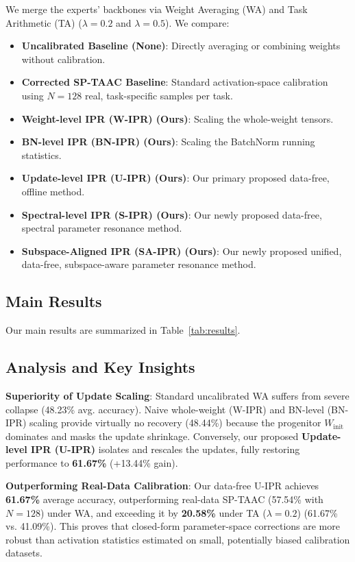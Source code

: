 \documentclass{article}
\begin{document}
We merge the experts' backbones via Weight Averaging (WA) and Task Arithmetic (TA) ($\lambda = 0.2$ and $\lambda = 0.5$). We compare:
\begin{itemize}
    \setlength{\itemsep}{1pt}
    \setlength{\parskip}{0pt}
    \setlength{\parsep}{0pt}
    \item \textbf{Uncalibrated Baseline (None)}: Directly averaging or combining weights without calibration.
    \item \textbf{Corrected SP-TAAC Baseline}: Standard activation-space calibration using $N=128$ real, task-specific samples per task.
    \item \textbf{Weight-level IPR (W-IPR) (Ours)}: Scaling the whole-weight tensors.
    \item \textbf{BN-level IPR (BN-IPR) (Ours)}: Scaling the BatchNorm running statistics.
    \item \textbf{Update-level IPR (U-IPR) (Ours)}: Our primary proposed data-free, offline method.
    \item \textbf{Spectral-level IPR (S-IPR) (Ours)}: Our newly proposed data-free, spectral parameter resonance method.
    \item \textbf{Subspace-Aligned IPR (SA-IPR) (Ours)}: Our newly proposed unified, data-free, subspace-aware parameter resonance method.
\end{itemize}

\subsection{Main Results}
Our main results are summarized in Table~\ref{tab:results}.

\subsection{Analysis and Key Insights}

\textbf{Superiority of Update Scaling}: Standard uncalibrated WA suffers from severe collapse (48.23\% avg. accuracy). Naive whole-weight (W-IPR) and BN-level (BN-IPR) scaling provide virtually no recovery (48.44\%) because the progenitor $W_{\text{init}}$ dominates and masks the update shrinkage. Conversely, our proposed \textbf{Update-level IPR (U-IPR)} isolates and rescales the updates, fully restoring performance to \textbf{61.67\%} (+13.44\% gain).

\textbf{Outperforming Real-Data Calibration}: Our data-free U-IPR achieves \textbf{61.67\%} average accuracy, outperforming real-data SP-TAAC (57.54\% with $N=128$) under WA, and exceeding it by \textbf{20.58\%} under TA ($\lambda = 0.2$) (61.67\% vs. 41.09\%). This proves that closed-form parameter-space corrections are more robust than activation statistics estimated on small, potentially biased calibration datasets.
\end{document}
